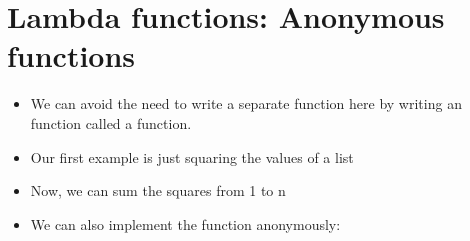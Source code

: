 \documentclass[letterpaper,10pt,english]{sphinxmanual}
\begin{document}
\section{Lambda functions:  Anonymous functions}
\label{\detokenize{lecture_notes/lec24_functional:lambda-functions-anonymous-functions}}\begin{itemize}
\item {} 
We can avoid the need to write a separate function here by writing an
 function called a  function.

\item {} 
Our first example is just squaring the values of a list

%
\begin{sphinxVerbatim}[commandchars=\\\{\}]
    \PYG{p}{[}     \PYG{p}{]} 
\end{sphinxVerbatim}

\item {} 
Now, we can sum the squares from 1 to n

%
\begin{sphinxVerbatim}[commandchars=\\\{\}]
  
     
\end{sphinxVerbatim}

\item {} 
We can also implement the  function anonymously:

\end{itemize}
\begin{quote}

%
\begin{sphinxVerbatim}[commandchars=\\\{\}]
    \PYG{p}{[}\PYG{p}{]}  \PYG{p}{[}\PYG{p}{]}  
\end{sphinxVerbatim}
\end{quote}
\end{document}
